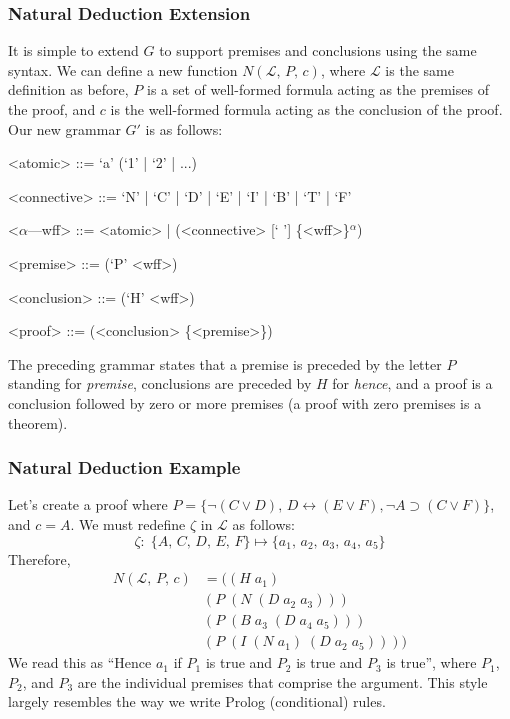 \documentclass[ms]{uncgdissertationexp2}
\theoremstyle{plain}
\theoremstyle{definition}
\theoremstyle{remark}
\begin{document}
\subsubsection{Natural Deduction Extension} It is simple to extend $G$ to support premises and conclusions using the same syntax. We can define a new function $N(\mathcal{L},\,P,\,c)$, where $\mathcal{L}$ is the same definition as before, $P$ is a set of well-formed formula acting as the premises of the proof, and $c$ is the well-formed formula acting as the conclusion of the proof. Our new grammar $G'$ is as follows:
\begin{grammar}
	<atomic> ::= `a' (`1' | `2' | ...)
	
	<connective> ::= `N' | `C' | `D' | `E' | `I' | `B' | `T' | `F' 
	
	<$\alpha$---wff> ::= <atomic> | (<connective> [` '] \{<wff>\}$^{\alpha}$)
	
	<premise> ::= (`P' <wff>)
	
	<conclusion> ::= (`H' <wff>)
	
	<proof> ::= (<conclusion> \{<premise>\})
\end{grammar}

The preceding grammar states that a premise is preceded by the letter $P$ standing for \textit{premise}, conclusions are preceded by $H$ for \textit{hence}, and a proof is a conclusion followed by zero or more premises (a proof with zero premises is a theorem).\\
\subsubsection{Natural Deduction Example}
Let's create a proof where $P = \{\lnot(C \lor D),\,D \leftrightarrow (E \lor F), \lnot A \supset (C \lor F)\}$, and $c = A$. We must redefine $\zeta$ in $\mathcal{L}$ as follows:
\[
	\zeta:\;\{A,\,C,\,D,\,E,\,F\} \mapsto \{a_1,\,a_2,\,a_3,\,a_4,\,a_5\}
\]
\noindent Therefore, 
\begin{align*}
	N(\mathcal{L},\,P,\,c) & = ((H\;a_1)\;                      \\
	                     & (P\;(N\;(D\;a_2\;a_3)))            \\
	                     & (P\;(B\;a_3\;(D\;a_4\;a_5)))       \\
	                     & (P\;(I\;(N\;a_1)\;(D\;a_2\;a_5))))
\end{align*}
We read this as ``Hence $a_1$ if $P_1$ is true and $P_2$ is true and $P_3$ is true'', where $P_1$, $P_2$, and $P_3$ are the individual premises that comprise the argument. This style largely resembles the way we write Prolog (conditional) rules. 
\end{document}
